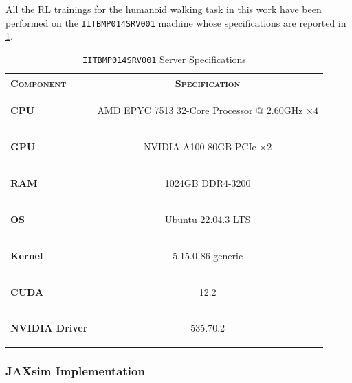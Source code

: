 All the \ac{RL} trainings for the humanoid walking task in this work have been performed on the \texttt{IITBMP014SRV001} machine whose specifications are reported in \cref{tab:srv001}.

\begin{table}[h]
    \centering
    \label{tab:srv001}
    \caption{\texttt{IITBMP014SRV001} Server Specifications}
    \begin{tabular}[h]{l c}
        \toprule
        \textsc{Component}     & \textsc{Specification}                                                       \\
        \midrule
        \textbf{CPU}           & \begin{small}AMD EPYC 7513 32-Core Processor @ 2.60GHz $\times 4$\end{small} \\
        \textbf{GPU}           & \begin{small}NVIDIA A100 80GB PCIe       $\times 2$             \end{small}  \\
        \textbf{RAM}           & \begin{small}1024GB DDR4-3200                         \end{small}            \\
        \textbf{OS}            & \begin{small}Ubuntu 22.04.3 LTS                       \end{small}            \\
        \textbf{Kernel}        & \begin{small}5.15.0-86-generic                        \end{small}            \\
        \textbf{CUDA}          & \begin{small}12.2                                  \end{small}               \\
        \textbf{NVIDIA Driver} & \begin{small}535.70.2                             \end{small}                \\
        \bottomrule
    \end{tabular}
\end{table}

\subsubsection{JAXsim Implementation}


